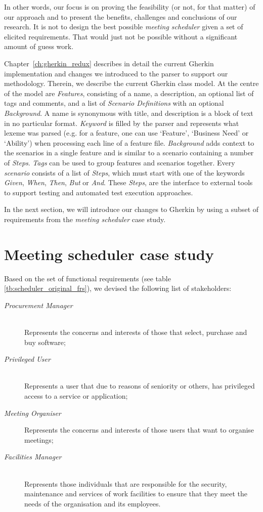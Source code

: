 \documentclass[dissertation,final]{softeng}
\begin{document}
In other words, our focus is on proving the feasibility (or not, for that matter) of our approach and to present the benefits, challenges and conclusions of our research. It is not to design the best possible \emph{meeting scheduler} given a set of elicited requirements. That would just not be possible without a significant amount of guess work. 

Chapter~\ref{ch:gherkin_redux} describes in detail the current Gherkin implementation and changes we introduced to the parser to support our methodology. Therein, we describe the current Gherkin class model. At the centre of the model are \emph{Features}, consisting of a name, a description, an optional list of tags and comments, and a list of \emph{Scenario Definitions} with an optional \emph{Background}. A name is synonymous with title, and description is a block of text in no particular format. \emph{Keyword} is filled by the parser and represents what lexeme was parsed (e.g. for a feature, one can use `Feature', `Business Need' or `Ability') when processing each line of a feature file. \emph{Background} adds context to the scenarios in a single feature and is similar to a scenario containing a number of \emph{Steps}. \emph{Tags} can be used to group features and scenarios together. Every \emph{scenario} consists of a list of \emph{Steps}, which must start with one of the keywords \emph{Given}, \emph{When}, \emph{Then}, \emph{But} or \emph{And}. These \emph{Steps}, are the interface to external tools to support testing and automated test execution approaches.

In the next section, we will introduce our changes to Gherkin by using a subset of requirements from the \emph{meeting scheduler} case study.

\section{Meeting scheduler case study}
\label{sec:case_study}
Based on the set of functional requirements (see table \ref{tb:scheduler_original_frs}), we devised the following list of stakeholders:

\begin{description}
\item[\emph{Procurement Manager}] \hfill \\
Represents the concerns and interests of those that select, purchase and buy software;
\item[\emph{Privileged User}] \hfill \\
Represents a user that due to reasons of seniority or others, has privileged access to a service or application;
\item[\emph{Meeting Organiser}] \hfill
Represents the concerns and interests of those users that want to organise meetings;
\item[\emph{Facilities Manager}] \hfill \\ 
Represents those individuals that are responsible for the security, maintenance and services of work facilities to ensure that they meet the needs of the organisation and its employees.
\end{description}
\end{document}
